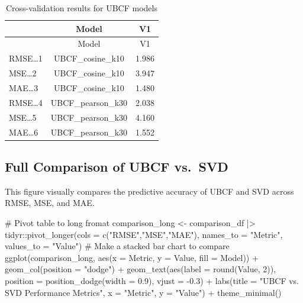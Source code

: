 \documentclass[
  12pt]{article}
\newenvironment{Shaded}{\begin{snugshade}}{\end{snugshade}}
\newcommand{\AttributeTok}[1]{\textcolor[rgb]{0.40,0.45,0.13}{#1}}
\newcommand{\CommentTok}[1]{\textcolor[rgb]{0.37,0.37,0.37}{#1}}
\newcommand{\DecValTok}[1]{\textcolor[rgb]{0.68,0.00,0.00}{#1}}
\newcommand{\FloatTok}[1]{\textcolor[rgb]{0.68,0.00,0.00}{#1}}
\newcommand{\FunctionTok}[1]{\textcolor[rgb]{0.28,0.35,0.67}{#1}}
\newcommand{\NormalTok}[1]{\textcolor[rgb]{0.00,0.23,0.31}{#1}}
\newcommand{\OtherTok}[1]{\textcolor[rgb]{0.00,0.23,0.31}{#1}}
\newcommand{\SpecialCharTok}[1]{\textcolor[rgb]{0.37,0.37,0.37}{#1}}
\newcommand{\StringTok}[1]{\textcolor[rgb]{0.13,0.47,0.30}{#1}}
\begin{document}
\begin{longtable}[]{@{}lcc@{}}
\caption{Cross-validation results for UBCF models}\tabularnewline
\toprule\noalign{}
& Model & V1 \\
\midrule\noalign{}
\endfirsthead
\toprule\noalign{}
& Model & V1 \\
\midrule\noalign{}
\endhead
\bottomrule\noalign{}
\endlastfoot
RMSE\ldots1 & UBCF\_cosine\_k10 & 1.986 \\
MSE\ldots2 & UBCF\_cosine\_k10 & 3.947 \\
MAE\ldots3 & UBCF\_cosine\_k10 & 1.480 \\
RMSE\ldots4 & UBCF\_pearson\_k30 & 2.038 \\
MSE\ldots5 & UBCF\_pearson\_k30 & 4.160 \\
MAE\ldots6 & UBCF\_pearson\_k30 & 1.552 \\
\end{longtable}

\subsection{Full Comparison of UBCF
vs.~SVD}\label{full-comparison-of-ubcf-vs.-svd}

This figure visually compares the predictive accuracy of UBCF and SVD
across RMSE, MSE, and MAE.

\begin{Shaded}
\begin{Highlighting}[]
\CommentTok{\# Pivot table to long fromat}
\NormalTok{comparison\_long }\OtherTok{\textless{}{-}}\NormalTok{ comparison\_df }\SpecialCharTok{|\textgreater{}} 
\NormalTok{  tidyr}\SpecialCharTok{::}\FunctionTok{pivot\_longer}\NormalTok{(}\AttributeTok{cols =} \FunctionTok{c}\NormalTok{(}\StringTok{"RMSE"}\NormalTok{,}\StringTok{"MSE"}\NormalTok{,}\StringTok{"MAE"}\NormalTok{),}
                      \AttributeTok{names\_to =} \StringTok{"Metric"}\NormalTok{, }\AttributeTok{values\_to =} \StringTok{"Value"}\NormalTok{)}
\CommentTok{\# Make a stacked bar chart to compare}
\FunctionTok{ggplot}\NormalTok{(comparison\_long, }\FunctionTok{aes}\NormalTok{(}\AttributeTok{x =}\NormalTok{ Metric, }\AttributeTok{y =}\NormalTok{ Value, }\AttributeTok{fill =}\NormalTok{ Model)) }\SpecialCharTok{+}
  \FunctionTok{geom\_col}\NormalTok{(}\AttributeTok{position =} \StringTok{"dodge"}\NormalTok{) }\SpecialCharTok{+}
  \FunctionTok{geom\_text}\NormalTok{(}\FunctionTok{aes}\NormalTok{(}\AttributeTok{label =} \FunctionTok{round}\NormalTok{(Value, }\DecValTok{2}\NormalTok{)), }
            \AttributeTok{position =} \FunctionTok{position\_dodge}\NormalTok{(}\AttributeTok{width =} \FloatTok{0.9}\NormalTok{), }\AttributeTok{vjust =} \SpecialCharTok{{-}}\FloatTok{0.3}\NormalTok{) }\SpecialCharTok{+}
  \FunctionTok{labs}\NormalTok{(}\AttributeTok{title =} \StringTok{"UBCF vs. SVD Performance Metrics"}\NormalTok{,}
       \AttributeTok{x =} \StringTok{"Metric"}\NormalTok{, }\AttributeTok{y =} \StringTok{"Value"}\NormalTok{) }\SpecialCharTok{+}
  \FunctionTok{theme\_minimal}\NormalTok{()}
\end{Highlighting}
\end{Shaded}
\end{document}
